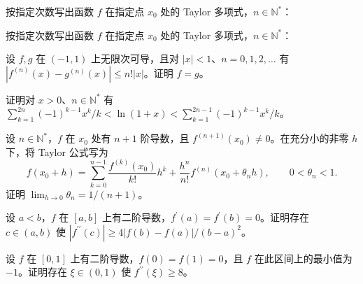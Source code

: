 \newpage
\noindent\begin{minipage}{\textwidth}
按指定次数写出函数 $f$ 在指定点 $x_0$ 处的 Taylor 多项式，$n\in\mathbb N^*$：
\end{minipage}\par\vfill
\noindent\begin{minipage}{\textwidth}
按指定次数写出函数 $f$ 在指定点 $x_0$ 处的 Taylor 多项式，$n\in\mathbb N^*$：
\end{minipage}\par\vfill
\noindent\begin{minipage}{\textwidth}
设 $f,g$ 在 $(-1,1)$ 上无限次可导，且对 $|x|<1$、$n=0,1,2,\ldots$ 有 $|f^{(n)}(x)-g^{(n)}(x)|\le n!|x|$。证明 $f=g$。
\end{minipage}\par\vfill
\newpage
\noindent\begin{minipage}{\textwidth}
证明对 $x>0$、$n\in\mathbb N^*$ 有 $\sum_{k=1}^{2n}(-1)^{k-1}x^k/k<\ln(1+x)<\sum_{k=1}^{2n-1}(-1)^{k-1}x^k/k$。
\end{minipage}\par\vfill
\noindent\begin{minipage}{\textwidth}
设 $n\in\mathbb N^*$，$f$ 在 $x_0$ 处有 $n+1$ 阶导数，且 $f^{(n+1)}(x_0)\ne0$。在充分小的非零 $h$ 下，将 Taylor 公式写为 \[f(x_0+h)=\sum_{k=0}^{n-1}\frac{f^{(k)}(x_0)}{k!}h^k+\frac{h^n}{n!}f^{(n)}(x_0+\theta_n h),\qquad 0<\theta_n<1.\] 证明 $\lim_{h\to0}\theta_n=1/(n+1)$。
\end{minipage}\par\vfill
\noindent\begin{minipage}{\textwidth}
设 $a<b$，$f$ 在 $[a,b]$ 上有二阶导数，$f^{\prime}(a)=f^{\prime}(b)=0$。证明存在 $c\in(a,b)$ 使 $|f^{\prime\prime}(c)|\ge4|f(b)-f(a)|/(b-a)^2$。
\end{minipage}\par\vfill
\newpage
\noindent\begin{minipage}{\textwidth}
设 $f$ 在 $[0,1]$ 上有二阶导数，$f(0)=f(1)=0$，且 $f$ 在此区间上的最小值为 $-1$。证明存在 $\xi\in(0,1)$ 使 $f^{\prime\prime}(\xi)\ge8$。
\end{minipage}\par\vfill
